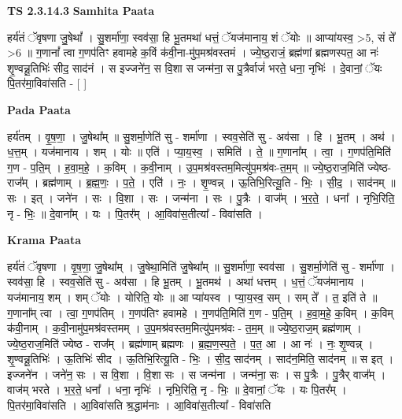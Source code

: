 \documentclass[17pt]{extarticle}
\begin{document}
\textbf{TS 2.3.14.3 } \newline
\textbf{Samhita Paata} \newline

हर्य॑तं ॅवृषणा जु॒षेथां᳚ । सु॒शर्मा॑णा॒ स्वव॑सा॒ हि भू॒तमथा॑ धत्तं॒ ॅयज॑मानाय॒ शं ॅयोः ॥ आप्या॑यस्व॒ >5, सं ते᳚ >6 ॥ ग॒णानां᳚ त्वा ग॒णप॑तिꣳ हवामहे क॒विं क॑वी॒ना-मु॑प॒मश्र॑वस्तमं । ज्ये॒ष्ठ॒राजं॒ ब्रह्म॑णां ब्रह्मणस्पत॒ आ नः॑ शृ॒ण्वन्नू॒तिभिः॑ सीद॒ साद॑नं । स इज्जने॑न॒ स वि॒शा स जन्म॑ना॒ स पु॒त्रैर्वाजं॑ भरते॒ धना॒ नृभिः॑ । दे॒वानां॒ ॅयः पि॒तर॑मा॒विवा॑सति - [  ] \newline

\textbf{Pada Paata} \newline

हर्य॑तम् । वृ॒ष॒णा॒ । जु॒षेथा᳚म् ॥ सु॒शर्मा॒णेति॑ सु - शर्मा॑णा । स्वव॒सेति॑ सु - अव॑सा । हि । भू॒तम् । अथ॑ । ध॒त्त॒म् । यज॑मानाय । शम् । योः ॥ एति॑ । प्या॒य॒स्व॒ । समिति॑ । ते॒ ॥ ग॒णाना᳚म् । त्वा॒ । ग॒णप॑ति॒मिति॑ ग॒ण - प॒ति॒म् । ह॒वा॒म॒हे॒ । क॒विम् । क॒वी॒नाम् । उ॒प॒मश्र॑वस्तम॒मित्यु॑प॒मश्र॑वः-त॒म॒म् ॥ ज्ये॒ष्ठ॒राज॒मिति॑ ज्येष्ठ-राज᳚म् । ब्रह्म॑णाम् । ब्र॒ह्म॒णः॒ । प॒ते॒ । एति॑ । नः॒ । शृ॒ण्वन्न् । ऊ॒तिभि॒रित्यू॒ति - भिः॒ । सी॒द॒ । साद॑नम् ॥ सः । इत् । जने॑न । सः । वि॒शा । सः । जन्म॑ना । सः । पु॒त्रैः । वाज᳚म् । भ॒र॒ते॒ । धना᳚ । नृभि॒रिति॒ नृ - भिः॒ ॥ दे॒वाना᳚म् । यः । पि॒तर᳚म् । आ॒विवा॑स॒तीत्या᳚ - विवा॑सति ।  \newline


\textbf{Krama Paata} \newline

हर्य॑तं ॅवृषणा । वृ॒ष॒णा॒ जु॒षेथा᳚म् । जु॒षेथा॒मिति॑ जु॒षेथा᳚म् ॥ सु॒शर्मा॑णा॒ स्वव॑सा । सु॒शर्मा॒णेति॑ सु - शर्मा॑णा । स्वव॑सा॒ हि । स्वव॒सेति॑ सु - अव॑सा । हि भू॒तम् । भू॒तमथ॑ । अथा॑ धत्तम् । ध॒त्तं॒ ॅयज॑मानाय । यज॑मानाय॒ शम् । शम् ॅयोः । योरिति॒ योः ॥ आ प्या॑यस्व । प्या॒य॒स्व॒ सम् । सम् ते᳚ । त॒ इति॑ ते ॥ ग॒णाना᳚म् त्वा । त्वा॒ ग॒णप॑तिम् । ग॒णप॑तिꣳ हवामहे । ग॒णप॑ति॒मिति॑ ग॒ण - प॒ति॒म् । ह॒वा॒म॒हे॒ क॒विम् । क॒विम् क॑वी॒नाम् । क॒वी॒नामु॑प॒मश्र॑वस्तमम् । उ॒प॒मश्र॑वस्तम॒मित्यु॑प॒मश्र॑वः - त॒म॒म् ॥ ज्ये॒ष्ठ॒राज॒म् ब्रह्म॑णाम् । ज्ये॒ष्ठ॒राज॒मिति॑ ज्येष्ठ - राज᳚म् । ब्रह्म॑णाम् ब्रह्मणः । ब्र॒ह्म॒ण॒स्प॒ते॒ । प॒त॒ आ । आ नः॑ । नः॒ शृ॒ण्वन्न् । शृ॒ण्वन्नू॒तिभिः॑ । ऊ॒तिभिः॑ सीद । ऊ॒तिभि॒रित्यू॒ति - भिः॒ । सी॒द॒ साद॑नम् । साद॑न॒मिति॒ साद॑नम् ॥ स इत् । इज्जने॑न । जने॑न॒ सः । स वि॒शा । वि॒शा सः । स जन्म॑ना । जन्म॑ना॒ सः । स पु॒त्रैः । पु॒त्रैर् वाज᳚म् । वाज॑म् भरते । भ॒र॒ते॒ धना᳚ । धना॒ नृभिः॑ । नृभि॒रिति॒ नृ - भिः॒ ॥ दे॒वानां॒ ॅयः । यः पि॒तर᳚म् । पि॒तर॑मा॒विवा॑सति । आ॒विवा॑सति श्र॒द्धाम॑नाः । आ॒विवा॑स॒तीत्या᳚ - विवा॑सति \newline
\end{document}
